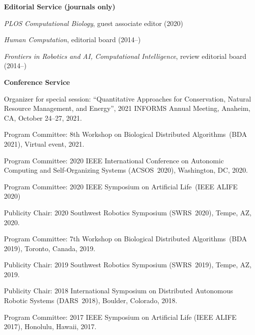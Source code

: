\documentclass[10pt]{article}           %
\newcommand{\halfblankline}{\quad\vspace{-0.5\baselineskip}\pagebreak[3]}
\begin{document}
\halfblankline

\textbf{Editorial Service (journals only)}
\begin{innerlist}
    \item \emph{PLOS Computational Biology}, guest associate editor (2020)
    \item \emph{Human Computation}, editorial board (2014--)
    \item \emph{Frontiers in Robotics and AI, Computational Intelligence}, review editorial board (2014--)
\end{innerlist}

\halfblankline

\textbf{Conference Service}
\begin{bibsection}[\enskip\textbullet,leftmargin=*]
    \item Organizer for special session: ``Quantitative Approaches for
        Conservation, Natural Resource Management, and Energy'', 2021
        INFORMS Annual Meeting, Anaheim, CA, October 24--27, 2021.

    \item Program Committee: 8th Workshop on Biological Distributed
        Algorithms~(BDA 2021), Virtual event, 2021.

    \item Program Committee: 2020 IEEE International Conference on
        Autonomic Computing and Self-Organizing Systems (ACSOS~2020),
        Washington, DC, 2020.

    \item Program Committee: 2020 IEEE Symposium on Artificial
        Life~(IEEE ALIFE 2020)

    \item Publicity Chair: 2020 Southwest Robotics Symposium
        (SWRS~2020), Tempe, AZ, 2020.

    \item Program Committee: 7th Workshop on Biological Distributed
        Algorithms~(BDA 2019), Toronto, Canada, 2019.

    \item Publicity Chair: 2019 Southwest Robotics Symposium
        (SWRS~2019), Tempe, AZ, 2019.

    \item Publicity Chair: 2018 International Symposium on Distributed
        Autonomous Robotic Systems (DARS~2018), Boulder, Colorado, 2018.

    \item Program Committee: 2017 IEEE Symposium on Artificial Life
        (IEEE ALIFE 2017), Honolulu, Hawaii, 2017.


\end{bibsection}
\end{document}
